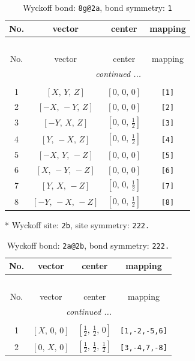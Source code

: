 \documentclass[fleqn,8pt]{jsarticle}
\begin{document}
\renewcommand{\arraystretch}{1.2}
\begin{longtable}{cccc}
\caption{Wyckoff bond: {\tt 8g@2a}, bond symmetry: {\tt 1}}
 \\
 \hline \hline
No. & vector & center & mapping \\ \hline \endfirsthead

\multicolumn{3}{l}{\tablename\ \thetable{}} \\
 \hline \hline
No. & vector & center & mapping \\ \hline \endhead

 \hline \hline
\multicolumn{3}{r}{\footnotesize\it continued ...} \\ \endfoot

 \hline \hline
\multicolumn{3}{r}{} \\ \endlastfoot

1 & $\left[ X,\, Y,\, Z \right]$ & $\left[ 0,\, 0,\, 0 \right]$ & {\tt [1]} \\ \hline
2 & $\left[ - X,\, - Y,\, Z \right]$ & $\left[ 0,\, 0,\, 0 \right]$ & {\tt [2]} \\ \hline
3 & $\left[ - Y,\, X,\, Z \right]$ & $\left[ 0,\, 0,\, \frac{1}{2} \right]$ & {\tt [3]} \\ \hline
4 & $\left[ Y,\, - X,\, Z \right]$ & $\left[ 0,\, 0,\, \frac{1}{2} \right]$ & {\tt [4]} \\ \hline
5 & $\left[ - X,\, Y,\, - Z \right]$ & $\left[ 0,\, 0,\, 0 \right]$ & {\tt [5]} \\ \hline
6 & $\left[ X,\, - Y,\, - Z \right]$ & $\left[ 0,\, 0,\, 0 \right]$ & {\tt [6]} \\ \hline
7 & $\left[ Y,\, X,\, - Z \right]$ & $\left[ 0,\, 0,\, \frac{1}{2} \right]$ & {\tt [7]} \\ \hline
8 & $\left[ - Y,\, - X,\, - Z \right]$ & $\left[ 0,\, 0,\, \frac{1}{2} \right]$ & {\tt [8]} \\
\end{longtable}
* Wyckoff site: {\tt 2b}, site symmetry: {\tt 222.}
\renewcommand{\arraystretch}{1.2}
\begin{longtable}{cccc}
\caption{Wyckoff bond: {\tt 2a@2b}, bond symmetry: {\tt 222.}}
 \\
 \hline \hline
No. & vector & center & mapping \\ \hline \endfirsthead

\multicolumn{3}{l}{\tablename\ \thetable{}} \\
 \hline \hline
No. & vector & center & mapping \\ \hline \endhead

 \hline \hline
\multicolumn{3}{r}{\footnotesize\it continued ...} \\ \endfoot

 \hline \hline
\multicolumn{3}{r}{} \\ \endlastfoot

1 & $\left[ X,\, 0,\, 0 \right]$ & $\left[ \frac{1}{2},\, \frac{1}{2},\, 0 \right]$ & {\tt [1,-2,-5,6]} \\ \hline
2 & $\left[ 0,\, X,\, 0 \right]$ & $\left[ \frac{1}{2},\, \frac{1}{2},\, \frac{1}{2} \right]$ & {\tt [3,-4,7,-8]} \\
\end{longtable}
\end{document}
